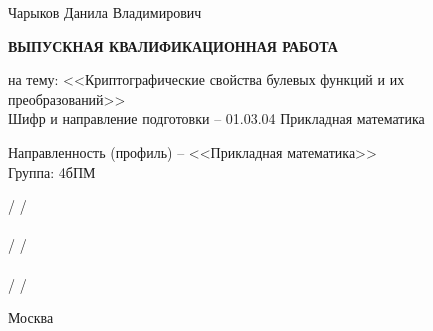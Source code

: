 \documentclass[12pt, a4paper]{article}
\begin{document}
\begin{titlepage}
    \vspace{0.8cm}

    \begin{center}
        {\large Чарыков Данила Владимирович}

        \vspace{0.7cm}

        \textbf{ВЫПУСКНАЯ КВАЛИФИКАЦИОННАЯ РАБОТА}

        \vspace{0.5cm}
    \end{center}

    \noindent на тему: <<Криптографические свойства булевых функций и их преобразований>> \\[0.2cm]
    Шифр и направление подготовки -- 01.03.04 Прикладная математика

    \vspace{0.3cm}

    \noindent Направленность (профиль) -- <<Прикладная математика>> \\[0.2cm]
    Группа: \quad 4бПМ

    \vspace{0.8cm}

    \noindent
     \underline{} / \underline{\hspace{4cm}} / \\
    \makebox[4.5cm][l]{}  \\[0.4cm]
    \noindent
     \underline{} / \underline{\hspace{4cm}} / \\
    \makebox[4.5cm][l]{}  \\[0.4cm]
    \noindent
     \underline{} / \underline{\hspace{4cm}} / \\
    \makebox[4.5cm][l]{} 

    \vfill

    \begin{center}
        Москва \\
        \the\year
    \end{center}

\end{titlepage}
\restoregeometry

\setcounter{page}{2}
\end{document}

